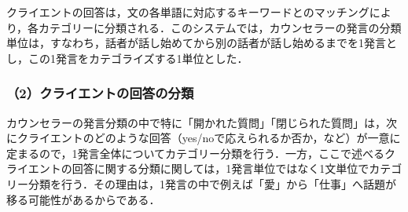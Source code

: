\documentclass[shuuron]{kuee}
\begin{document}






クライエントの回答は，文の各単語に対応するキーワードとのマッチングにより，各カテゴリーに分類される．このシステムでは，カウンセラーの発言の分類単位は，すなわち，話者が話し始めてから別の話者が話し始めるまでを1発言とし，この1発言をカテゴライズする1単位とした．







\subsubsection{（2）クライエントの回答の分類}



カウンセラーの発言分類の中で特に「開かれた質問」「閉じられた質問」は，次にクライエントのどのような回答（yes/noで応えられるか否か，など）が一意に定まるので，1発言全体についてカテゴリー分類を行う．一方，ここで述べるクライエントの回答に関する分類に関しては，1発言単位ではなく1文単位でカテゴリー分類を行う．その理由は，1発言の中で例えば「愛」から「仕事」へ話題が移る可能性があるからである．
\end{document}
